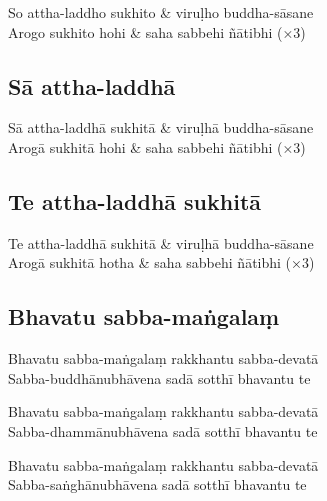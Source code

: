 \begin{twochants}
So attha-laddho sukhito & viruḷho buddha-sāsane\\
Arogo sukhito hohi & saha sabbehi ñātibhi (×3)\\
\end{twochants}

\subsection{Sā attha-laddhā}


\begin{twochants}
Sā attha-laddhā sukhitā & viruḷhā buddha-sāsane\\
Arogā sukhitā hohi & saha sabbehi ñātibhi (×3)\\
\end{twochants}

\subsection{Te attha-laddhā sukhitā}
\label{te-attha-laddha}


\begin{twochants}
Te attha-laddhā sukhitā & viruḷhā buddha-sāsane\\
Arogā sukhitā hotha & saha sabbehi ñātibhi (×3)\\
\end{twochants}


\subsection{Bhavatu sabba-maṅgalaṃ}
\label{bhavatu}


Bhavatu sabba-maṅgalaṃ rakkhantu sabba-devatā\\
Sabba-buddhānubhāvena sadā sotthī bhavantu te

Bhavatu sabba-maṅgalaṃ rakkhantu sabba-devatā\\
Sabba-dhammānubhāvena sadā sotthī bhavantu te

Bhavatu sabba-maṅgalaṃ rakkhantu sabba-devatā\\
Sabba-saṅghānubhāvena sadā sotthī bhavantu te

